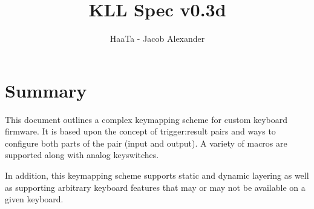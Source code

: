 \documentclass{kiibohd-template}
\begin{document}


\title{KLL Spec v0.3d}
\author{HaaTa - Jacob Alexander}

\maketitle


\begin{versionhistory}
\end{versionhistory}

\printtables

\chapter{Summary}

This document outlines a complex keymapping scheme for custom keyboard firmware.
It is based upon the concept of trigger:result pairs and ways to configure both parts of the pair (input and output).
A variety of macros are supported along with analog keyswitches.

In addition, this keymapping scheme supports static and dynamic layering as well as supporting arbitrary keyboard features that may or may not be available on a given keyboard.
\end{document}
